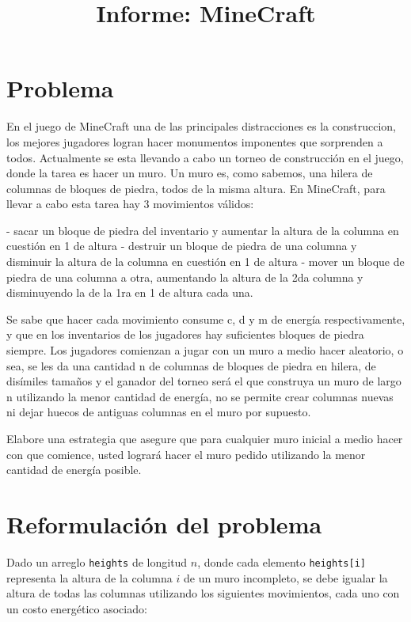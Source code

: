 \documentclass[a4paper,12pt]{article}
\title{Informe: MineCraft}
\date{}
\begin{document}
\maketitle

\tableofcontents

\section{Problema}

En el juego de MineCraft una de las principales distracciones es la construccion, los mejores jugadores logran hacer monumentos imponentes que sorprenden a todos. Actualmente se esta llevando a cabo un torneo de construcción en el juego, donde la tarea es hacer un muro. Un muro es, como sabemos, una hilera de columnas de bloques de piedra, todos de la misma altura. En MineCraft, para llevar a cabo esta tarea hay 3 movimientos válidos: 

- sacar un bloque de piedra del inventario y aumentar la altura de la columna en cuestión en 1 de altura 
- destruir un bloque de piedra de una columna y disminuir la altura de la columna en cuestión en 1 de altura 
- mover un bloque de piedra de una columna a otra, aumentando la altura de la 2da columna y disminuyendo la de la 1ra en 1 de altura cada una.

Se sabe que hacer cada movimiento consume c, d y m de energía respectivamente, y que en los inventarios de los jugadores hay suficientes bloques de piedra siempre. Los jugadores comienzan a jugar con un muro a medio hacer aleatorio, o sea, se les da una cantidad n de columnas de bloques de piedra en hilera, de disímiles tamaños y el ganador del torneo será el que construya un muro de largo n utilizando la menor cantidad de energía, no se permite crear columnas nuevas ni dejar huecos de antiguas columnas en el muro por supuesto. 

Elabore una estrategia que asegure que para cualquier muro inicial a medio hacer con que comience, usted logrará hacer el muro pedido utilizando la menor cantidad de energía posible.


\section{Reformulación del problema}

Dado un arreglo \texttt{heights} de longitud $n$, donde cada elemento \texttt{heights[i]} representa la altura de la columna $i$ de un muro incompleto, se debe igualar la altura de todas las columnas utilizando los siguientes movimientos, cada uno con un costo energético asociado:
\end{document}
